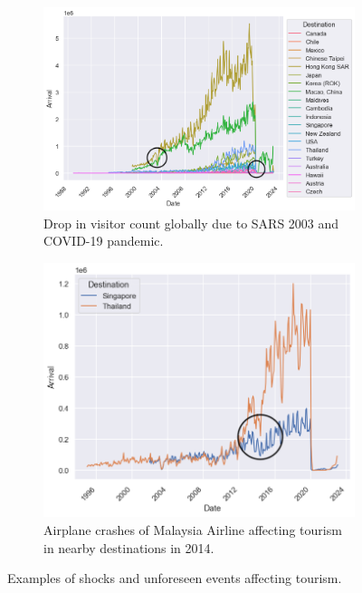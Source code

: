 \documentclass{article}
\begin{document}
\begin{figure}
     \centering
     \begin{subfigure}[b]{0.52\textwidth}
         \centering
         \includegraphics[width=\textwidth]{images/pandemic shock.png}
         \caption{Drop in visitor count globally due to SARS 2003 and COVID-19 pandemic.}
     \end{subfigure}
     \begin{subfigure}[b]{0.43\textwidth}
         \centering
         \includegraphics[width=\textwidth]{images/plane accident shock.png}
         \caption{Airplane crashes of Malaysia Airline affecting tourism in nearby destinations in 2014.}
     \end{subfigure}
    \caption{Examples of shocks and unforeseen events affecting tourism.}
    \label{fig:shocks}
\end{figure}
\end{document}
